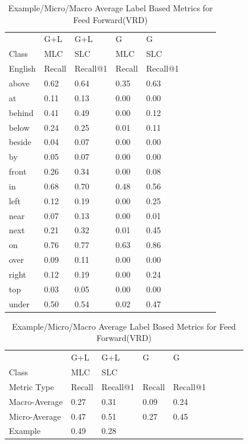 \documentclass{IEEEtran}
\begin{document}
\begin{table}[!htbp]
\caption{VRD Feed Forward Neural Network Evaluation Results}
\centering
\begin{tabular}{|l|l|l|l|l|llll}
\cline{1-5}
        &  G+L & G+L & G & G \\ \cline{1-5}
Class   &  MLC       & SLC        &  MLC       & SLC        \\ \cline{1-5}
English &  Recall    & Recall@1   &  Recall    & Recall@1   \\ \cline{1-5}
above	&	0.62	 &	0.64  &	0.35      &	0.63    \\ \cline{1-5}
at	   	&	0.11	 &	0.13  &	0.00 	&	0.00	\\ \cline{1-5} 
behind	&	0.41	 &	0.49  &	0.00  	&	0.12    \\ \cline{1-5} 
below	&	0.24 	 &	0.25  &	0.01 	&	0.11	\\ \cline{1-5} 
beside	&	0.04     &	0.07  &	0.00	&	0.00	\\ \cline{1-5} 
by 	   	&	0.05	 &	0.07  &	0.00	&	0.00	\\ \cline{1-5} 
front	&	0.26   	 &	0.34  &	0.00	&	0.08	\\ \cline{1-5} 
in   	&	0.68   	 &	0.70  &	0.48	&	0.56	\\ \cline{1-5} 
left	&	0.12   	 &	0.19  &	0.00	&	0.25	\\ \cline{1-5} 
near	&	0.07 	 &	0.13  &	0.00	&	0.01 	\\ \cline{1-5}
next	&	0.21	 &	0.32  &	0.01	&	0.45 	\\ \cline{1-5} 
on	   	&	0.76	 &	0.77  &	0.63	&	0.86 	\\ \cline{1-5} 
over	&	0.09	 &	0.11  &	0.00	&	0.00	\\ \cline{1-5} 
right	&	0.12	 &	0.19  &	0.00	&	0.24 	\\ \cline{1-5} 
top	   	&	0.03	 &	0.05  &	0.00	&	0.00 	\\ \cline{1-5} 
under	&	0.50	 &	0.54  &	0.02    &	0.47 	\\ \cline{1-5}
\end{tabular}
\caption{Feed Forward NN(VRD) results for MLC and SLC}
\centering
\begin{tabular}{|l|l|l|l|l|llll}
\cline{1-5}
      &  G+L  & G+L   &  G   & G 	 \\ \cline{1-5}
Class &  MLC  & SLC 				 \\ \cline{1-5}
Metric Type    &  Recall  & Recall@1  & Recall & Recall@1    \\ \cline{1-5}
Macro-Average &	0.27      &	0.31	  &	0.09   &	0.24	 \\ \cline{1-5}
Micro-Average &	0.47      &	0.51      &	0.27   &	0.45	 \\ \cline{1-5}
Example       &	0.49     			  &	0.28	             \\ \cline{1-5}
\end{tabular}
\caption{Example/Micro/Macro Average Label Based Metrics for Feed Forward(VRD)}
\end{table}
\end{document}
